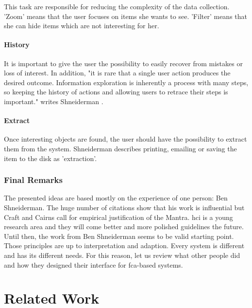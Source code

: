 \documentclass[11pt]{report}
\begin{document}
This task are responsible for reducing the complexity of the data collection. 'Zoom' means that the user focuses on items she wants to see. 'Filter' means that she can hide items which are not interesting for her.

\subsubsection{History}

It is important to give the user the possibility to easily recover from mistakes or loss of interest. In addition, "it is rare that a single user action produces the desired outcome. Information exploration is inherently a process with many steps, so keeping the history of actions and allowing users to retrace their steps is important." writes Shneiderman \cite{Shneiderman1996}.

\subsubsection{Extract}

Once interesting objects are found, the user should have the possibility to extract them from the system. Shneiderman describes printing, emailing or saving the item to the disk as 'extraction'.

\subsection{Final Remarks}

The presented ideas are based mostly on the experience of one person: Ben Shneiderman. The huge number of citations show that his work is influential but Craft and Cairns \cite{Craft2005} call for empirical justification of the Mantra. \acrshort{hci} is a young research area and they will come better and more polished guidelines the future. Until then, the work from Ben Shneiderman seems to be valid starting point. \\

Those principles are up to interpretation and adaption. Every system is different and has its different needs. For this reason, let us review what other people did and how they designed their interface for \acrshort{fca}-based systems.

\chapter{Related Work}
\label{Related Work}
\end{document}

